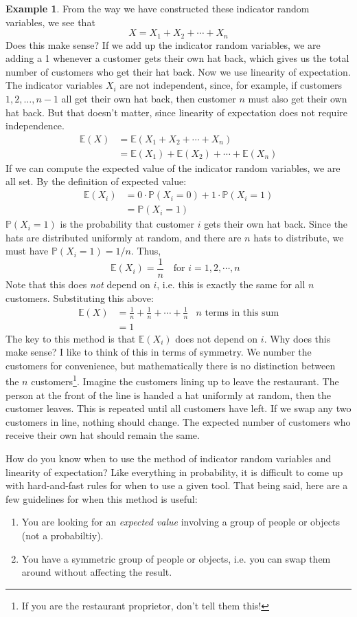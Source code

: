 \documentclass[12pt]{article}
\theoremstyle{definition}
\newtheorem*{example}{Example}
\theoremstyle{remark}
\def\P{{\mathbb P}}
\def\E{{\mathbb E}}
\begin{document}
\begin{example}
From the way we have constructed these indicator random variables, we see that
\[
X = X_1 + X_2 + \cdots + X_n
\]
Does this make sense? If we add up the indicator random variables, we are adding a 1 whenever a customer gets their own hat back, which gives us the total number of customers who get their hat back. Now we use linearity of expectation. The indicator variables $X_i$ are not independent, since, for example, if customers $1, 2, \dots, n-1$ all get their own hat back, then customer $n$ must also get their own hat back. But that doesn't matter, since linearity of expectation does not require independence.
\begin{align*}
\E(X) &= \E(X_1 + X_2 + \cdots + X_n) \\
&= \E(X_1) + \E(X_2) + \cdots + \E(X_n)
\end{align*}
If we can compute the expected value of the indicator random variables, we are all set. By the definition of expected value:
\begin{align*}
\E(X_i) &= 0 \cdot \P(X_i = 0) + 1 \cdot \P(X_i = 1) \\
&= \P(X_i = 1)
\end{align*}
$\P(X_i = 1)$ is the probability that customer $i$ gets their own hat back. Since the hats are distributed uniformly at random, and there are $n$ hats to distribute, we must have $\P(X_i = 1) = 1/n$. Thus,
\[
\E(X_i) = \frac{1}{n} \:\:\:\text{ for $i = 1, 2, \cdots, n$ }
\]
Note that this does \emph{not} depend on $i$, i.e. this is exactly the same for all $n$ customers. Substituting this above:
\begin{align*}
\E(X) &= \frac{1}{n} + \frac{1}{n} + \cdots + \frac{1}{n} &\text{$n$ terms in this sum}\\
&= 1
\end{align*}
The key to this method is that $\E(X_i)$ does not depend on $i$. Why does this make sense? I like to think of this in terms of symmetry. We number the customers for convenience, but mathematically there is no distinction between the $n$ customers\footnote{If you are the restaurant proprietor, don't tell them this!}. Imagine the customers lining up to leave the restaurant. The person at the front of the line is handed a hat uniformly at random, then the customer leaves. This is repeated until all customers have left. If we swap any two customers in line, nothing should change. The expected number of customers who receive their own hat should remain the same.
\end{example}

How do you know when to use the method of indicator random variables and linearity of expectation? Like everything in probability, it is difficult to come up with hard-and-fast rules for when to use a given tool. That being said, here are a few guidelines for when this method is useful:
\begin{enumerate}
\item You are looking for an \emph{expected value} involving a group of people or objects (not a probabiltiy).
\item You have a symmetric group of people or objects, i.e. you can swap them around without affecting the result.
\end{enumerate}
\end{document}
